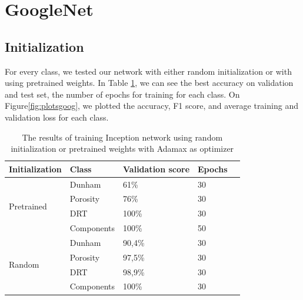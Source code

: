 

\section{GoogleNet}\label{sec:gogl}
\subsection{Initialization}
For every class, we tested our network with either random initialization or with using pretrained weights. In Table \ref{tab:googinit}, we can see the best accuracy on validation and test set, the number of epochs for training for each class.  
On Figure\ref{fig:plotsgoog}, we plotted the accuracy, F1 score, and average training and validation loss for each class. 

\begin{table}
\caption{\label{tab:googinit} The results of training Inception network using random initialization or pretrained weights with Adamax as optimizer}
\centering
\begin{tabular}[b]{| l | l | l | l | l |}
\hline
    Initialization & Class & Validation score  & Epochs\\ \hline
    \multirow{4}{*}{Pretrained} & Dunham &  61\%  & 30 \\ %
    & Porosity & 76\% &  30 \\
    &DRT & 100\% &  30 \\
    &Components & 100\% &  50 \\ \hline
     \multirow{4}{*}{Random} & Dunham &  90,4\% & 30 \\
    & Porosity & 97,5\% &  30 \\
    &DRT & 98,9\% &  30 \\
    &Components & 100\% & 30 \\ \hline
\end{tabular} 
\end{table}


